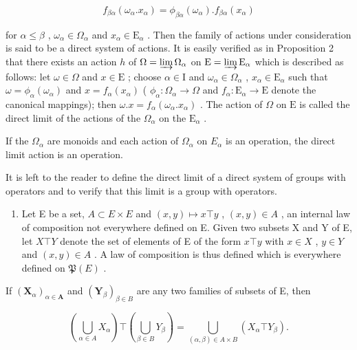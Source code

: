 \[
f _ {\beta \alpha} (\omega_ {\alpha}. x _ {\alpha}) = \phi_ {\beta \alpha} (\omega_ {\alpha}). f _ {\beta \alpha} (x _ {\alpha})
\]

for \(\alpha \leqslant \beta\) , \(\omega_{\alpha} \in \Omega_{\alpha}\) and \(x_{\alpha} \in \mathrm{E}_{\alpha}\) . Then the family of actions under consideration is said to be a direct system of actions. It is easily verified as in Proposition 2 that there exists an action \(h\) of \(\Omega = \varinjlim \Omega_{\alpha}\) on \(\mathrm{E} = \varinjlim \mathrm{E}_{\alpha}\) which is described as follows: let \(\omega \in \Omega\) and \(x \in \mathrm{E}\) ; choose \(\alpha \in \mathrm{I}\) and \(\omega_{\alpha} \in \Omega_{\alpha}\) , \(x_{\alpha} \in \mathrm{E}_{\alpha}\) such that \(\omega = \phi_{\alpha}(\omega_{\alpha})\) and \(x = f_{\alpha}(x_{\alpha})\) ( \(\phi_{\alpha}: \Omega_{\alpha} \to \Omega\) and \(f_{\alpha}: \mathrm{E}_{\alpha} \to \mathrm{E}\) denote the canonical mappings); then \(\omega . x = f_{\alpha}(\omega_{\alpha}. x_{\alpha})\) . The action of \(\Omega\) on \(\mathrm{E}\) is called the direct limit of the actions of the \(\Omega_{\alpha}\) on the \(\mathrm{E}_{\alpha}\) .

If the \(\Omega_{\alpha}\) are monoids and each action of \(\Omega_{\alpha}\) on \(E_{\alpha}\) is an operation, the direct limit action is an operation.

It is left to the reader to define the direct limit of a direct system of groups with operators and to verify that this limit is a group with operators.

\BourbakiExercisesSection

\begin{enumerate}
\def\labelenumi{\arabic{enumi}.}
\tightlist
\item
  Let E be a set, \(A \subset E \times E\) and \((x, y) \mapsto x \top y\) , \((x, y) \in A\) , an internal law of composition not everywhere defined on E. Given two subsets X and Y of E, let \(X \top Y\) denote the set of elements of E of the form \(x \top y\) with \(x \in X\) , \(y \in Y\) and \((x, y) \in A\) . A law of composition is thus defined which is everywhere defined on \(\mathfrak{P}(E)\) .
\end{enumerate}

If \((\mathbf{X}_{\alpha})_{\alpha \in \mathbf{A}}\) and \((\mathbf{Y}_{\beta})_{\beta \in B}\) are any two families of subsets of E, then

\[
\left(\bigcup_ {\alpha \in A} X _ {\alpha}\right) \top \left(\bigcup_ {\beta \in B} Y _ {\beta}\right) = \bigcup_ {(\alpha , \beta) \in A \times B} (X _ {\alpha} \top Y _ {\beta}).
\]

